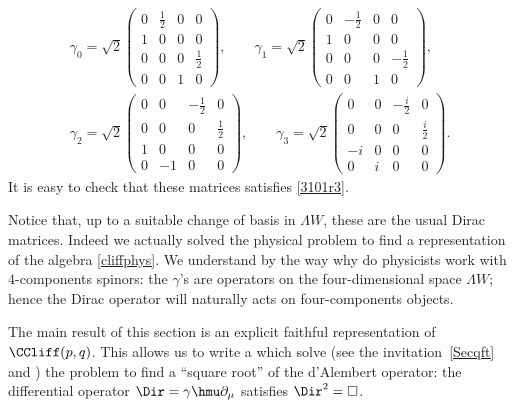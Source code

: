\begin{equation}
	\begin{split}
		\gamma_0=\sqrt{2}\begin{pmatrix}
			0 & \frac{1}{2} & 0 & 0           \\
			1 & 0           & 0 & 0           \\
			0 & 0           & 0 & \frac{1}{2} \\
			0 & 0           & 1 & 0
		\end{pmatrix}, \qquad
		\gamma_1=\sqrt{2}\left(\begin{matrix}
				0 & -\frac{1}{2} & 0 & 0            \\
				1 & 0            & 0 & 0            \\
				0 & 0            & 0 & -\frac{1}{2} \\
				0 & 0            & 1 & 0
			\end{matrix}\right),\\
		\gamma_2=\sqrt{2}\begin{pmatrix}
			0 & 0  & -\frac{1}{2} & 0           \\
			0 & 0  & 0            & \frac{1}{2} \\
			1 & 0  & 0            & 0           \\
			0 & -1 & 0            & 0
		\end{pmatrix},\qquad
		\gamma_3=\sqrt{2}\begin{pmatrix}
			0  & 0 & -\frac{i}{2} & 0           \\
			0  & 0 & 0            & \frac{i}{2} \\
			-i & 0 & 0            & 0           \\
			0  & i & 0            & 0
		\end{pmatrix}.
	\end{split}
\end{equation}
It is easy to check that these matrices satisfies \eqref{3101r3}.

Notice that, up to a suitable change of basis in $\Lambda W $, these are the usual Dirac matrices. Indeed we actually solved the physical problem to find a representation of the algebra \eqref{cliffphys}.  We understand by the way why do physicists work with $4$-components spinors: the $\gamma$'s are operators on the four-dimensional space $\Lambda W$; hence the Dirac operator will naturally acts on four-components objects.

The main result of this section is an explicit faithful representation of $\CCliff(p,q)$. This allows us to write a  which solve (see the invitation~\ref{Secqft} and \cite{Bronn}) the problem  to find a ``square root'' of the d'Alembert operator: the differential operator $\Dir=\gamma\hmu\partial_{\mu}$ satisfies $\Dir^2=\Box$.

